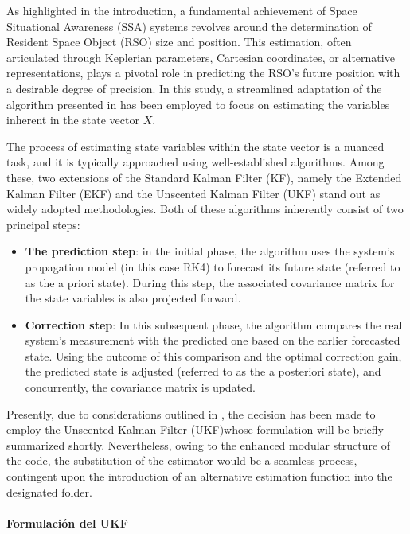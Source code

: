 As highlighted in the introduction, a fundamental achievement of Space Situational Awareness (SSA) systems revolves around the determination of Resident Space Object (RSO) size and position. This estimation, often articulated through Keplerian parameters, Cartesian coordinates, or alternative representations, plays a pivotal role in predicting the RSO's future position with a desirable degree of precision. In this study, a streamlined adaptation of the algorithm presented in \cite{linares} has been employed to focus on estimating the variables inherent in the state vector $X$.

The process of estimating state variables within the state vector is a nuanced task, and it is typically approached using well-established algorithms. Among these, two extensions of the Standard Kalman Filter (KF), namely the Extended Kalman Filter (EKF) \cite{EKF} and the Unscented Kalman Filter (UKF) \cite{UKF} stand out as widely adopted methodologies. Both of these algorithms inherently consist of two principal steps:

\begin{itemize}
    \item \textbf{The prediction step}: in the initial phase, the algorithm uses the system's propagation model (in this case RK4) to forecast its future state (referred to as the a priori state). During this step, the associated covariance matrix for the state variables is also projected forward.
    \item \textbf{Correction step}: In this subsequent phase, the algorithm compares the real system's measurement with the predicted one based on the earlier forecasted state. Using the outcome of this comparison and the optimal correction gain, the predicted state is adjusted (referred to as the a posteriori state), and concurrently, the covariance matrix is updated.
\end{itemize}

Presently, due to considerations outlined in \cite{ref:UKFvsEKF}, the decision has been made to employ the Unscented Kalman Filter (UKF)whose formulation will be briefly summarized shortly. Nevertheless, owing to the enhanced modular structure of the code, the substitution of the estimator would be a seamless process, contingent upon the introduction of an alternative estimation function into the designated folder.

\paragraph{Formulación del UKF}

